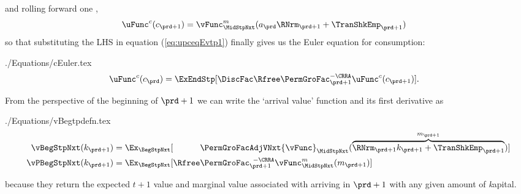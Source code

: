 \documentclass[\econtexRoot/SolvingMicroDSOPs]{subfiles}
\begin{document}
\unskip
and rolling forward one {\interval},
\begin{equation}\begin{gathered}\begin{aligned}
      \uFunc^{{c}}({c}_{\prd+1})  & = {\vFunc}^{{m}}_{\MidStpNxt}({a}_{\prd}\RNrm_{\prd+1}+\TranShkEmp_{\prd+1}) \label{eq:upctp1EqVpxtp1}
    \end{aligned}\end{gathered}\end{equation}
so that substituting the LHS in equation (\ref{eq:upceqEvtp1}) finally gives us the Euler equation for consumption:
\begin{verbatimwrite}{./Equations/cEuler.tex}
  \begin{equation}\begin{gathered}\begin{aligned}
        \uFunc^{{c}}({c}_{\prd})  & = \ExEndStp[\DiscFac\Rfree \PermGroFac_{\prd+1}^{-\CRRA}\uFunc^{{c}}({c}_{\prd+1})] \label{eq:cEuler}.
      \end{aligned}\end{gathered}\end{equation}
\end{verbatimwrite}
\unskip

From the perspective of the beginning of {\interval} $\prd+1$ we can write the `arrival value' function and its first derivative as
\begin{verbatimwrite}{./Equations/vBegtpdefn.tex}
  \begin{equation}\begin{gathered}\begin{aligned}
        \vBegStpNxt({k}_{\prd+1})    & = \Ex_{\BegStpNxt}[\phantom{\Rfree}\PermGroFacAdjVNxt{\vFunc}_{\MidStpNxt}(\overbrace{\RNrm_{\prd+1}{k}_{\prd+1}+{\TranShkEmp}_{\prd+1}}^{{m}_{\prd+1}})] \label{eq:vFuncBegtpdefn} \\
        {\vPBegStpNxt}({k}_{\prd+1}) & = \Ex_{\BegStpNxt}[\Rfree \PermGroFac_{\prd+1}^{\phantom{1}-\CRRA} {\vFunc}_{\MidStpNxt}^{{m}}({m}_{\prd+1})]
      \end{aligned}\end{gathered}\end{equation}
\end{verbatimwrite}\unskip
\unskip
because they return the expected $t+1$ value and marginal value associated with arriving in {\interval} $\prd+1$ with any given amount of \textit{k}apital.
\end{document}
